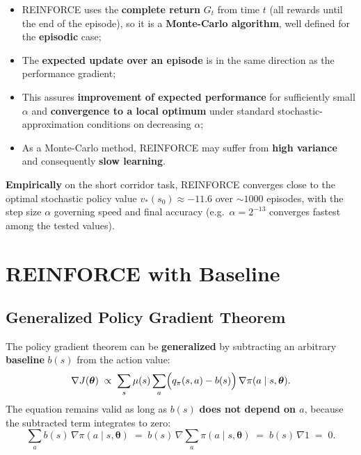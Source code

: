 \documentclass[11pt,a4paper]{article}
\theoremstyle{definition}
\theoremstyle{plain}
\theoremstyle{remark}
\begin{document}
\begin{tcolorbox}[colback=green!5!white, colframe=green!60!black, title={Theoretical Properties}]
\begin{itemize}
    \item REINFORCE uses the \textbf{complete return} $G_t$ from time $t$ (all rewards until the end of the episode), so it is a \textbf{Monte-Carlo algorithm}, well defined for the \textbf{episodic} case;
    \item The \textbf{expected update over an episode} is in the same direction as the performance gradient;
    \item This assures \textbf{improvement of expected performance} for sufficiently small $\alpha$ and \textbf{convergence to a local optimum} under standard stochastic-approximation conditions on decreasing $\alpha$;
    \item As a Monte-Carlo method, REINFORCE may suffer from \textbf{high variance} and consequently \textbf{slow learning}.
\end{itemize}
\end{tcolorbox}

\textbf{Empirically} on the short corridor task, REINFORCE converges close to the optimal stochastic policy value $v_*(s_0) \approx -11.6$ over $\sim 1000$ episodes, with the step size $\alpha$ governing speed and final accuracy (e.g.\ $\alpha = 2^{-13}$ converges fastest among the tested values).

\section{REINFORCE with Baseline}

\subsection{Generalized Policy Gradient Theorem}

The policy gradient theorem can be \textbf{generalized} by subtracting an arbitrary \textbf{baseline} $b(s)$ from the action value:
\[
    \nabla J(\boldsymbol{\theta}) \;\propto\; \sum_s \mu(s) \sum_a \Bigl(q_\pi(s, a) - b(s)\Bigr)\, \nabla \pi(a \mid s, \boldsymbol{\theta}).
\]
The equation remains valid as long as $b(s)$ \textbf{does not depend on $a$}, because the subtracted term integrates to zero:
\[
    \sum_a b(s)\, \nabla \pi(a \mid s, \boldsymbol{\theta}) \;=\; b(s)\, \nabla \sum_a \pi(a \mid s, \boldsymbol{\theta}) \;=\; b(s)\, \nabla 1 \;=\; 0.
\]
\end{document}
